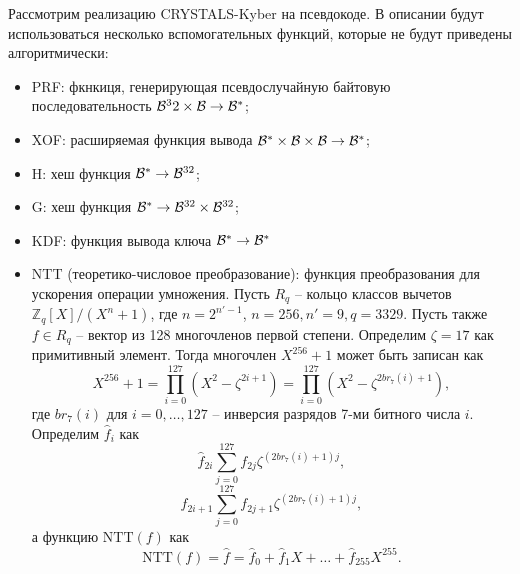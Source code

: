 Рассмотрим реализацию CRYSTALS-Kyber на псевдокоде. В описании будут использоваться несколько вспомогательных функций, которые не будут приведены алгоритмически:
\begin{itemize}
    \item PRF: фкнкиця, генерирующая псевдослучайную байтовую последовательность ${\cal B}^32 \times {\cal B} \rightarrow {\cal B}^*$;
    \item XOF: расширяемая функция вывода ${\cal B}^* \times {\cal B} \times {\cal B} \rightarrow {\cal B}^*$;
    \item H: хеш функция ${\cal B}^* \rightarrow {\cal B}^{32}$;
    \item G: хеш функция ${\cal B}^* \rightarrow {\cal B}^{32} \times {\cal B}^{32}$;
    \item KDF: функция вывода ключа ${\cal B}^* \rightarrow {\cal B}^*$
    \item NTT (теоретико-числовое преобразование): функция преобразования для ускорения операции умножения. Пусть $R_q$ -- кольцо классов вычетов $\mathbb{Z}_q[X]/(X^n+1)$, где $n=2^{n'-1}$, $n = 256, n' = 9, q = 3329$. Пусть также $f \in R_q$ -- вектор из 128 многочленов первой степени. Определим $\zeta = 17$ как примитивный элемент. Тогда многочлен $X^{256} + 1$ может быть записан как
    \[
    X^{256} + 1 = \prod_{i=0}^{127}(X^2 - \zeta^{2i+1}) = \prod_{i=0}^{127}(X^2 - \zeta^{2br_7(i)+1}),
    \]
    где $br_7(i)$ для $i = 0, \ldots, 127$ -- инверсия разрядов 7-ми битного числа $i$. Определим $\hat{f}_i$ как 
    \[
    \hat{f}_{2i} \sum_{j=0}^{127} f_{2j} \zeta^{(2br_7(i)+1)j}, 
    \]
    \[
    \hat{f}_{2i+1} \sum_{j=0}^{127} f_{2j+1} \zeta^{(2br_7(i)+1)j},
    \]
    а функцию $\text{NTT}(f)$ как
    \[
    \text{NTT}(f) = \hat{f} = \hat{f}_0 + \hat{f}_1X + \ldots + \hat{f}_{255}X^{255}.
    \]
\end{itemize}

